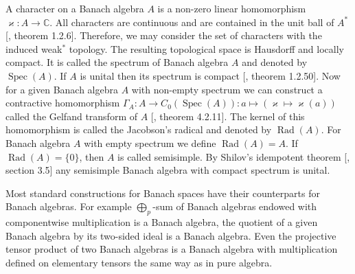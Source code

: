 A character on a Banach algebra $A$ is a non-zero linear homomorphism
$\varkappa:A\to\mathbb{C}$. All characters are continuous and are contained in
the unit ball of $A^*$  [\cite{HelBanLocConvAlg}, theorem 1.2.6]. Therefore, we
may consider the set of characters with the induced weak$^*$ topology. The
resulting topological space is Hausdorff and locally compact. It is called the
spectrum of Banach algebra $A$ and denoted by $\operatorname{Spec}(A)$. If $A$
is unital then its spectrum is compact [\cite{HelBanLocConvAlg}, theorem
1.2.50]. Now for a given Banach algebra $A$ with non-empty spectrum we can
construct a contractive homomorphism $\Gamma_A:A\to
C_0(\operatorname{Spec}(A)):a\mapsto(\varkappa\mapsto \varkappa(a))$ called the
Gelfand transform of $A$ [\cite{HelBanLocConvAlg}, theorem 4.2.11]. The kernel
of this homomorphism is called the Jacobson's radical and denoted by
$\operatorname{Rad}(A)$. For Banach algebra $A$ with empty spectrum we define
$\operatorname{Rad}(A)=A$. If $\operatorname{Rad}(A)= \{0 \}$, then $A$ is
called semisimple. By Shilov's idempotent theorem [\cite{KaniBanAlg}, section
3.5] any semisimple Banach algebra with compact spectrum is unital.

Most standard constructions for Banach spaces have their counterparts for
Banach algebras. For example $\bigoplus_p$-sum of Banach algebras endowed with
componentwise multiplication is a Banach algebra, the quotient of a given Banach
algebra by its two-sided ideal is a Banach algebra. Even the projective tensor
product of two Banach algebras is a Banach algebra with multiplication defined
on elementary tensors the same way as in pure algebra.

